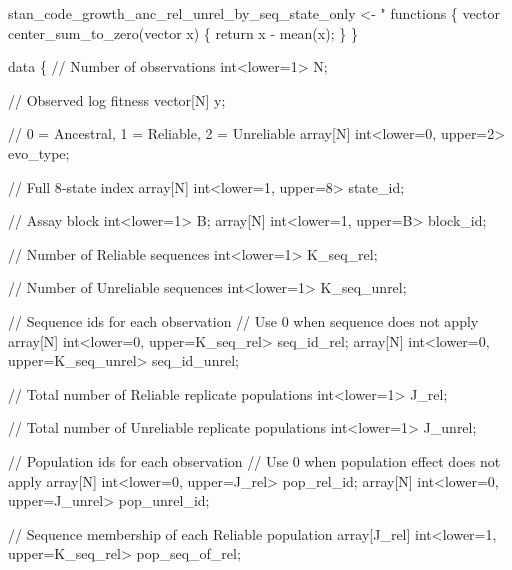 \documentclass[
]{article}
\newenvironment{Shaded}{\begin{snugshade}}{\end{snugshade}}
\newcommand{\NormalTok}[1]{#1}
\newcommand{\OtherTok}[1]{\textcolor[rgb]{0.56,0.35,0.01}{#1}}
\newcommand{\StringTok}[1]{\textcolor[rgb]{0.31,0.60,0.02}{#1}}
\begin{document}
\begin{Shaded}
\begin{Highlighting}[]
\NormalTok{stan\_code\_growth\_anc\_rel\_unrel\_by\_seq\_state\_only }\OtherTok{\textless{}{-}} \StringTok{"}
\StringTok{functions \{}
\StringTok{  vector center\_sum\_to\_zero(vector x) \{}
\StringTok{    return x {-} mean(x);}
\StringTok{  \}}
\StringTok{\}}

\StringTok{data \{}
\StringTok{  // Number of observations}
\StringTok{  int\textless{}lower=1\textgreater{} N;}

\StringTok{  // Observed log fitness}
\StringTok{  vector[N] y;}

\StringTok{  // 0 = Ancestral, 1 = Reliable, 2 = Unreliable}
\StringTok{  array[N] int\textless{}lower=0, upper=2\textgreater{} evo\_type;}

\StringTok{  // Full 8{-}state index}
\StringTok{  array[N] int\textless{}lower=1, upper=8\textgreater{} state\_id;}

\StringTok{  // Assay block}
\StringTok{  int\textless{}lower=1\textgreater{} B;}
\StringTok{  array[N] int\textless{}lower=1, upper=B\textgreater{} block\_id;}

\StringTok{  // Number of Reliable sequences}
\StringTok{  int\textless{}lower=1\textgreater{} K\_seq\_rel;}

\StringTok{  // Number of Unreliable sequences}
\StringTok{  int\textless{}lower=1\textgreater{} K\_seq\_unrel;}

\StringTok{  // Sequence ids for each observation}
\StringTok{  // Use 0 when sequence does not apply}
\StringTok{  array[N] int\textless{}lower=0, upper=K\_seq\_rel\textgreater{} seq\_id\_rel;}
\StringTok{  array[N] int\textless{}lower=0, upper=K\_seq\_unrel\textgreater{} seq\_id\_unrel;}

\StringTok{  // Total number of Reliable replicate populations}
\StringTok{  int\textless{}lower=1\textgreater{} J\_rel;}

\StringTok{  // Total number of Unreliable replicate populations}
\StringTok{  int\textless{}lower=1\textgreater{} J\_unrel;}

\StringTok{  // Population ids for each observation}
\StringTok{  // Use 0 when population effect does not apply}
\StringTok{  array[N] int\textless{}lower=0, upper=J\_rel\textgreater{} pop\_rel\_id;}
\StringTok{  array[N] int\textless{}lower=0, upper=J\_unrel\textgreater{} pop\_unrel\_id;}

\StringTok{  // Sequence membership of each Reliable population}
\StringTok{  array[J\_rel] int\textless{}lower=1, upper=K\_seq\_rel\textgreater{} pop\_seq\_of\_rel;}


\end{Highlighting}
\end{Shaded}
\end{document}
